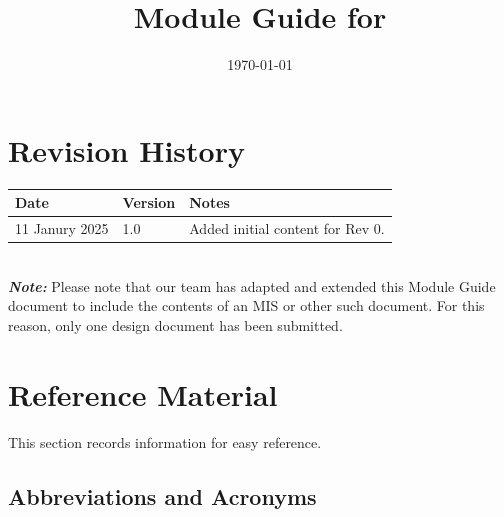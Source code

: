 \documentclass[12pt, titlepage]{article}
\begin{document}
\title{Module Guide for \progname{}} 
\author{\authname}
\date{\today}

\maketitle


\section{Revision History}

\begin{tabularx}{\textwidth}{p{3cm}p{2cm}X}
\toprule {\bf Date} & {\bf Version} & {\bf Notes}\\
\midrule
11 Janury 2025 & 1.0 & Added initial content for Rev 0.\\
\bottomrule
\end{tabularx}
\\
\newline \newline
\emph{\textbf{Note:}} Please note that our team has adapted and extended this
Module Guide document to include the contents of an MIS or other such document.
For this reason, only one design document has been submitted.
\newpage

\section{Reference Material}

This section records information for easy reference.

\subsection{Abbreviations and Acronyms}
\end{document}
